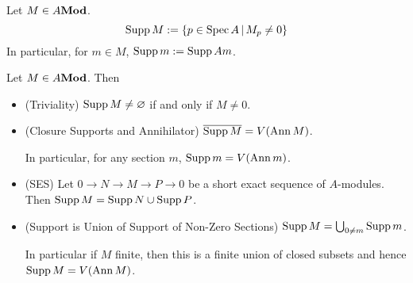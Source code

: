 \begin{dfn}
  
  Let $M \in A\mathbf{Mod}$.
  \[
    \operatorname{Supp} M := \left\{p \in \operatorname{Spec} A \,|\, M_p \neq 0\right\}
  \]
  In particular, for $m \in M$,
  $\operatorname{Supp} m := \operatorname{Supp} Am$.
\end{dfn}
\begin{prop}

  Let $M \in A\mathbf{Mod}$.
  Then \begin{itemize}
    \item (Triviality)
    $\operatorname{Supp} M \neq \varnothing$ if and only if $M \neq 0$.
    \item (Closure Supports and Annihilator) 
    $\overline{\operatorname{Supp} M} = V(\operatorname{Ann} M)$.

    In particular, for any section $m$, $\operatorname{Supp} m = V(\operatorname{Ann} m)$.
    
    \item (SES)
    Let $0 \to N \to M \to P \to 0$ be a short exact sequence of 
    $A$-modules. \newline
    Then $\operatorname{Supp} M = \operatorname{Supp} N \cup \operatorname{Supp} P$.
    \item (Support is Union of Support of Non-Zero Sections)
    $\operatorname{Supp} M = \bigcup_{0 \neq m} \operatorname{Supp} m$. 

    In particular if $M$ finite, then
    this is a finite union of closed subsets and hence 
    $\operatorname{Supp} M = V(\operatorname{Ann} M)$.
  \end{itemize}
\end{prop}
